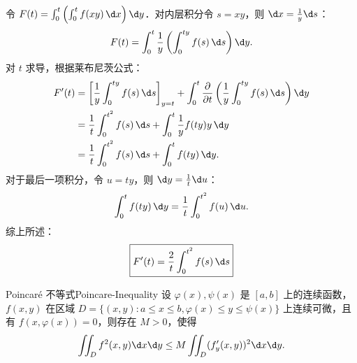 \begin{myproof}
    令 $F(t) = \int_0^t \left( \int_0^t f(xy) \, \d x \right) \d y$．对内层积分令 $s = xy$，则 $\d x = \frac{1}{y} \d s$：
    \begin{equation}
        F(t) = \int_0^t \frac{1}{y} \left( \int_0^{ty} f(s) \, \d s \right) \d y.
    \end{equation}
    对 $t$ 求导，根据莱布尼茨公式：
    \begin{equation}
        \begin{aligned}
            F'(t) & = \left[ \frac{1}{y} \int_0^{ty} f(s) \, \d s \right]_{y=t} + \int_0^t \frac{\partial}{\partial t} \left( \frac{1}{y} \int_0^{ty} f(s) \, \d s \right) \d y \\
                  & = \frac{1}{t} \int_0^{t^2} f(s) \, \d s + \int_0^t \frac{1}{y} f(ty) y \, \d y                                                                              \\
                  & = \frac{1}{t} \int_0^{t^2} f(s) \, \d s + \int_0^t f(ty) \, \d y.
        \end{aligned}
    \end{equation}
    对于最后一项积分，令 $u = ty$，则 $\d y = \frac{1}{t} \d u$：
    \begin{equation}
        \int_0^t f(ty) \, \d y = \frac{1}{t} \int_0^{t^2} f(u) \, \d u.
    \end{equation}
    综上所述：
    \begin{equation}
        \boxed{F'(t) = \frac{2}{t} \int_0^{t^2} f(s) \, \d s}
    \end{equation}
\end{myproof}


\begin{problem}{Poincaré 不等式}{Poincare-Inequality}
    设 $\varphi(x), \psi(x)$ 是 $[a, b]$ 上的连续函数，$f(x, y)$ 在区域 $D = \{(x, y) : a \le x \le b, \varphi(x) \le y \le \psi(x)\}$ 上连续可微，且有 $f(x, \varphi(x)) = 0$，则存在 $M > 0$，使得
    \begin{equation}
        \iint_D f^2(x, y) \d x \d y \le M \iint_D (f'_y(x, y))^2 \d x \d y.
    \end{equation}
\end{problem}

